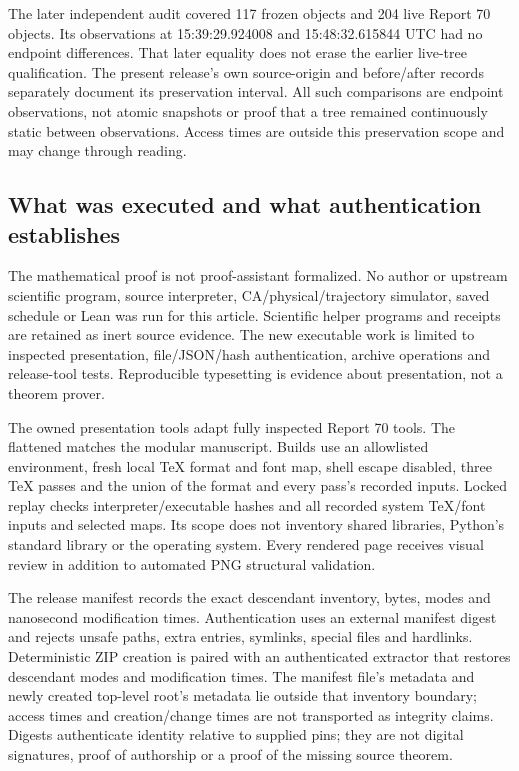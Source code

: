 \documentclass[11pt,a4paper]{article}
\numberwithin{equation}{section}
\newcommand{\file}[1]{\texttt{\detokenize{#1}}}
\begin{document}
The later independent audit covered 117 frozen objects and 204 live Report 70 objects. Its observations at 15:39:29.924008 and 15:48:32.615844 UTC had no endpoint differences. That later equality does not erase the earlier live-tree qualification. The present release's own source-origin and before/after records separately document its preservation interval. All such comparisons are endpoint observations, not atomic snapshots or proof that a tree remained continuously static between observations. Access times are outside this preservation scope and may change through reading.

\subsection{What was executed and what authentication establishes}
The mathematical proof is not proof-assistant formalized. No author or upstream scientific program, source interpreter, CA/physical/trajectory simulator, saved schedule or Lean was run for this article. Scientific helper programs and receipts are retained as inert source evidence. The new executable work is limited to inspected presentation, file/JSON/hash authentication, archive operations and release-tool tests. Reproducible typesetting is evidence about presentation, not a theorem prover.

The owned presentation tools adapt fully inspected Report 70 tools. The flattened \file{Report71.tex} matches the modular manuscript. Builds use an allowlisted environment, fresh local TeX format and font map, shell escape disabled, three TeX passes and the union of the format and every pass's recorded inputs. Locked replay checks interpreter/executable hashes and all recorded system TeX/font inputs and selected maps. Its scope does not inventory shared libraries, Python's standard library or the operating system. Every rendered page receives visual review in addition to automated PNG structural validation.

The release manifest records the exact descendant inventory, bytes, modes and nanosecond modification times. Authentication uses an external manifest digest and rejects unsafe paths, extra entries, symlinks, special files and hardlinks. Deterministic ZIP creation is paired with an authenticated extractor that restores descendant modes and modification times. The manifest file's metadata and newly created top-level root's metadata lie outside that inventory boundary; access times and creation/change times are not transported as integrity claims. Digests authenticate identity relative to supplied pins; they are not digital signatures, proof of authorship or a proof of the missing source theorem.
\end{document}
